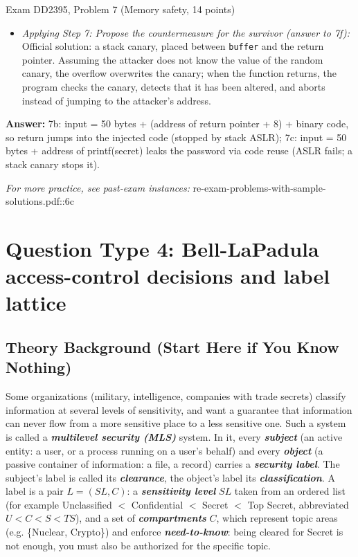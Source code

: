 \documentclass[12pt, a4paper]{article}
\newcommand{\term}[1]{\textbf{\textit{#1}}}        %
\begin{document}
\begin{practicebox}{Exam DD2395, Problem 7 (Memory safety, 14 points)}
\begin{itemize}
    \item \textit{Applying Step 7: Propose the countermeasure for the survivor (answer to 7f):} Official solution: a stack canary, placed between \texttt{buffer} and the return pointer. Assuming the attacker does not know the value of the random canary, the overflow overwrites the canary; when the function returns, the program checks the canary, detects that it has been altered, and aborts instead of jumping to the attacker's address.
\end{itemize}
\textbf{Answer:} 7b: input = 50 bytes + (address of return pointer + 8) + binary code, so return jumps into the injected code (stopped by stack ASLR); 7c: input = 50 bytes + address of printf(secret) leaks the password via code reuse (ASLR fails; a stack canary stops it).
\end{practicebox}

\textit{For more practice, see past-exam instances:} re-exam-problems-with-sample-solutions.pdf::6c

\section{Question Type 4: Bell-LaPadula access-control decisions and label lattice}

\subsection*{Theory Background (Start Here if You Know Nothing)}
Some organizations (military, intelligence, companies with trade secrets) classify information at several levels of sensitivity, and want a guarantee that information can never flow from a more sensitive place to a less sensitive one. Such a system is called a \term{multilevel security (MLS)} system. In it, every \term{subject} (an active entity: a user, or a process running on a user's behalf) and every \term{object} (a passive container of information: a file, a record) carries a \term{security label}. The subject's label is called its \term{clearance}, the object's label its \term{classification}. A label is a pair $L = (SL, C)$: a \term{sensitivity level} $SL$ taken from an ordered list (for example Unclassified $<$ Confidential $<$ Secret $<$ Top Secret, abbreviated $U < C < S < TS$), and a set of \term{compartments} $C$, which represent topic areas (e.g. \{Nuclear, Crypto\}) and enforce \term{need-to-know}: being cleared for Secret is not enough, you must also be authorized for the specific topic.
\end{document}
